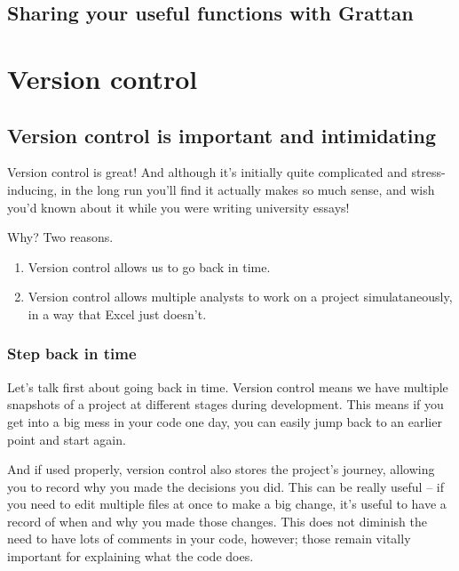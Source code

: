 \documentclass[
]{book}
\begin{document}
\hypertarget{sharing-your-useful-functions-with-grattan}{%
\section{Sharing your useful functions with Grattan}\label{sharing-your-useful-functions-with-grattan}}

\hypertarget{version-control}{%
\chapter{Version control}\label{version-control}}

\hypertarget{version-control-is-important-and-intimidating}{%
\section{Version control is important and intimidating}\label{version-control-is-important-and-intimidating}}

Version control is great! And although it's initially quite complicated and stress-inducing, in the long run you'll find it actually makes so much sense, and wish you'd known about it while you were writing university essays!

Why? Two reasons.

\begin{enumerate}
\def\labelenumi{\arabic{enumi}.}
\item
  Version control allows us to go back in time.
\item
  Version control allows multiple analysts to work on a project simulataneously, in a way that Excel just doesn't.
\end{enumerate}

\hypertarget{step-back-in-time}{%
\subsection{Step back in time}\label{step-back-in-time}}

Let's talk first about going back in time. Version control means we have multiple snapshots of a project at different stages during development. This means if you get into a big mess in your code one day, you can easily jump back to an earlier point and start again.

And if used properly, version control also stores the project's journey, allowing you to record why you made the decisions you did. This can be really useful -- if you need to edit multiple files at once to make a big change, it's useful to have a record of when and why you made those changes. This does not diminish the need to have lots of comments in your code, however; those remain vitally important for explaining what the code does.
\end{document}
